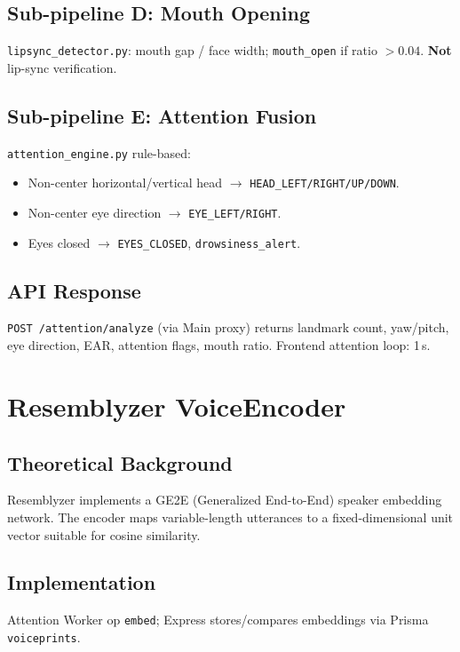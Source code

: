 \documentclass[11pt,a4paper]{report}
\begin{document}
\subsection{Sub-pipeline D: Mouth Opening}
\texttt{lipsync\_detector.py}: mouth gap / face width; \texttt{mouth\_open} if ratio $> 0.04$. \textbf{Not} lip-sync verification.

\subsection{Sub-pipeline E: Attention Fusion}
\texttt{attention\_engine.py} rule-based:
\begin{itemize}
  \item Non-center horizontal/vertical head $\rightarrow$ \texttt{HEAD\_LEFT/RIGHT/UP/DOWN}.
  \item Non-center eye direction $\rightarrow$ \texttt{EYE\_LEFT/RIGHT}.
  \item Eyes closed $\rightarrow$ \texttt{EYES\_CLOSED}, \texttt{drowsiness\_alert}.
\end{itemize}

\subsection{API Response}
\texttt{POST /attention/analyze} (via Main proxy) returns landmark count, yaw/pitch, eye direction, EAR, attention flags, mouth ratio. Frontend attention loop: 1\,s.

\section{Resemblyzer VoiceEncoder}

\subsection{Theoretical Background}
Resemblyzer implements a GE2E (Generalized End-to-End) speaker embedding network. The encoder maps variable-length utterances to a fixed-dimensional unit vector suitable for cosine similarity.

\subsection{Implementation}
Attention Worker op \texttt{embed}; Express stores/compares embeddings via Prisma \texttt{voiceprints}.
\end{document}
